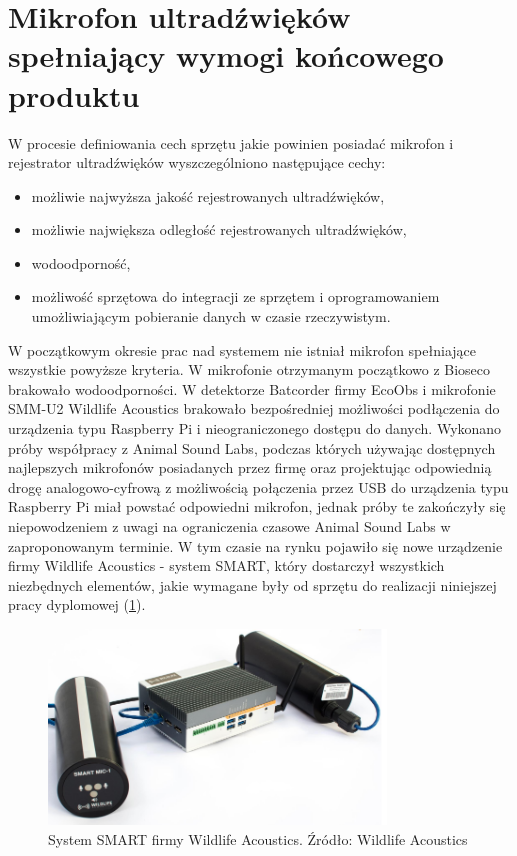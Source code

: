 \documentclass{sprz}
\begin{document}
\section{Mikrofon ultradźwięków spełniający wymogi końcowego produktu}
W procesie definiowania cech sprzętu jakie powinien posiadać mikrofon i rejestrator ultradźwięków wyszczególniono następujące cechy:
  \begin{itemize}
    \item{możliwie najwyższa jakość rejestrowanych ultradźwięków,}
    \item{możliwie największa odległość rejestrowanych ultradźwięków,}
    \item{wodoodporność,}
    \item{możliwość sprzętowa do integracji ze sprzętem i oprogramowaniem umożliwiającym pobieranie danych w czasie rzeczywistym.}
  \end{itemize}

W początkowym okresie prac nad systemem nie istniał mikrofon spełniające wszystkie powyższe kryteria. W mikrofonie otrzymanym początkowo z Bioseco brakowało wodoodporności. W detektorze Batcorder firmy EcoObs i mikrofonie SMM-U2 Wildlife Acoustics brakowało bezpośredniej możliwości podłączenia do urządzenia typu Raspberry Pi i nieograniczonego dostępu do danych. Wykonano próby współpracy z Animal Sound Labs, podczas których używając dostępnych najlepszych mikrofonów posiadanych przez firmę oraz projektując odpowiednią drogę analogowo-cyfrową z możliwością połączenia przez USB do urządzenia typu Raspberry Pi miał powstać odpowiedni mikrofon, jednak próby te zakończyły się niepowodzeniem z uwagi na ograniczenia czasowe Animal Sound Labs w zaproponowanym terminie. W tym czasie na rynku pojawiło się nowe urządzenie firmy Wildlife Acoustics - system SMART, który dostarczył wszystkich niezbędnych elementów, jakie wymagane były od sprzętu do realizacji niniejszej pracy dyplomowej (\ref{img:smart}). 

\begin{figure}[h]
  \centering
  \includegraphics[width=0.8\textwidth]{sprz/smart.png}
  \caption{System SMART firmy Wildlife Acoustics. Źródło: Wildlife Acoustics}
  \label{img:smart}
\end{figure} 
\end{document}
